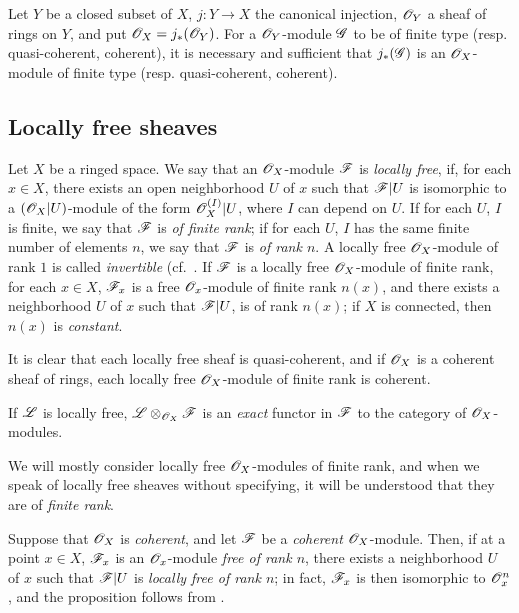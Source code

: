 \begin{env}[5.3.12]
\label{0.5.3.12}
Let $Y$ be a closed subset of $X$, $j:Y\to X$ the canonical injection, $\mathscr{O}_Y$ a
sheaf of rings on $Y$, and put $\mathscr{O}_X=j_*(\mathscr{O}_Y)$. For a $\mathscr{O}_Y$-module $\mathscr{G}$
to be of finite type (resp. quasi-coherent, coherent), it is necessary and
sufficient that $j_*(\mathscr{G})$ is an $\mathscr{O}_X$-module of finite type
(resp. quasi-coherent, coherent).
\end{env}

\subsection{Locally free sheaves}
\label{subsection-locally-free-sheaves}

\begin{env}[5.4.1]
\label{0.5.4.1}
Let $X$ be a ringed space. We say that an $\mathscr{O}_X$-module $\mathscr{F}$ is
{\em locally free}, if, for each $x\in X$, there exists an open neighborhood
$U$ of $x$ such that $\mathscr{F}|U$ is isomorphic to a $(\mathscr{O}_X|U)$-module of the
form $\mathscr{O}_X^{(I)}|U$, where $I$ can depend on $U$. If for each $U$, $I$ is
finite, we say that $\mathscr{F}$ is {\em of finite rank}; if for each $U$, $I$ has
the same finite number of elements $n$, we say that $\mathscr{F}$ is {\em of rank
$n$}. A locally free $\mathscr{O}_X$-module of rank $1$ is called {\em invertible}
(cf.~. If $\mathscr{F}$ is a locally free $\mathscr{O}_X$-module of finite
rank, for each $x\in X$, $\mathscr{F}_x$ is a free $\mathscr{O}_x$-module of finite rank
$n(x)$, and there exists a neighborhood $U$ of $x$ such that $\mathscr{F}|U$, is of
rank $n(x)$; if $X$ is connected, then $n(x)$ is {\em constant}.

It is clear that each locally free sheaf is quasi-coherent, and if $\mathscr{O}_X$ is a
coherent sheaf of rings, each locally free $\mathscr{O}_X$-module of finite rank is
coherent.

If $\mathscr{L}$ is locally free, $\mathscr{L}\otimes_{\mathscr{O}_X}\mathscr{F}$ is an {\em exact}
functor in $\mathscr{F}$ to the category of $\mathscr{O}_X$-modules.

We will mostly consider locally free $\mathscr{O}_X$-modules of finite rank,
and when we speak of locally free sheaves without specifying, it will be
understood that they are of {\em finite rank}.

Suppose that $\mathscr{O}_X$ is {\em coherent}, and let $\mathscr{F}$ be a {\em coherent}
$\mathscr{O}_X$-module. Then, if at a point $x\in X$, $\mathscr{F}_x$ is an $\mathscr{O}_x$-module
{\em free of rank $n$}, there exists a neighborhood $U$ of $x$ such that
$\mathscr{F}|U$ is {\em locally free of rank $n$}; in fact, $\mathscr{F}_x$ is then
isomorphic to $\mathscr{O}_x^n$, and the proposition follows from .
\end{env}

